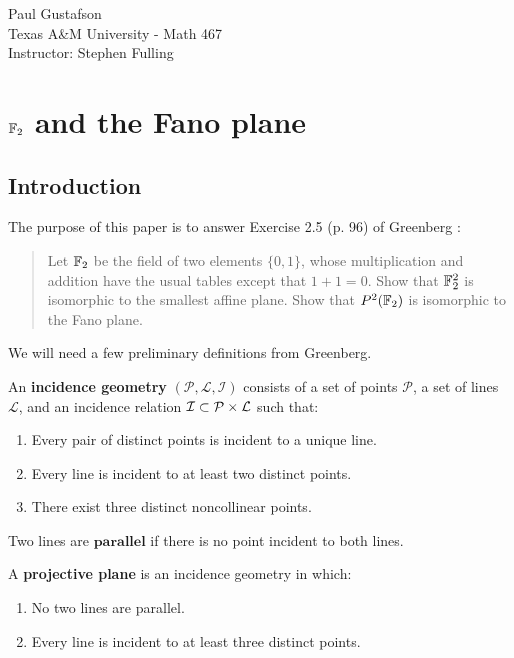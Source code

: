 \documentclass{article}
\begin{document}
\noindent Paul Gustafson\\
\noindent Texas A\&M University - Math 467\\ 
\noindent Instructor: Stephen Fulling

\section{$\mathbb{F}_2$ and the Fano plane}
\subsection{Introduction}
The purpose of this paper is to answer Exercise 2.5 (p. 96) of Greenberg \cite{g}:
\begin{quote}
Let $\mathbb{F}_2$ be the field of two elements $\{0,1\}$, whose multiplication and addition have the usual tables except that $1+1 = 0$. Show that $\mathbb{F}_2^2$ is isomorphic to the smallest affine plane. Show that $P^2(\mathbb{F}_2)$ is isomorphic to the Fano plane.
\end{quote}

We will need a few preliminary definitions from Greenberg.

\begin{definition}
An \textbf{incidence geometry} $(\mathcal{P}, \mathcal{L}, \mathcal{I})$ consists of a set of points $\mathcal{P}$, a set of lines $\mathcal{L}$, and an incidence relation $\mathcal{I} \subset \mathcal{P} \times \mathcal{L}$ such that:
\begin{enumerate}
\item Every pair of distinct points is incident to a unique line.%
\item Every line is incident to at least two distinct points.
\item There exist three distinct noncollinear points. %
\end{enumerate}
\end{definition}

\begin{definition}
Two lines are $\textbf{parallel}$ if there is no point incident to both lines.
\end{definition}


\begin{definition}
A \textbf{projective plane} is an incidence geometry in which:
\begin{enumerate}
\item No two lines are parallel.
\item Every line is incident to at least three distinct points.
\end{enumerate}
\end{definition}
\end{document}
